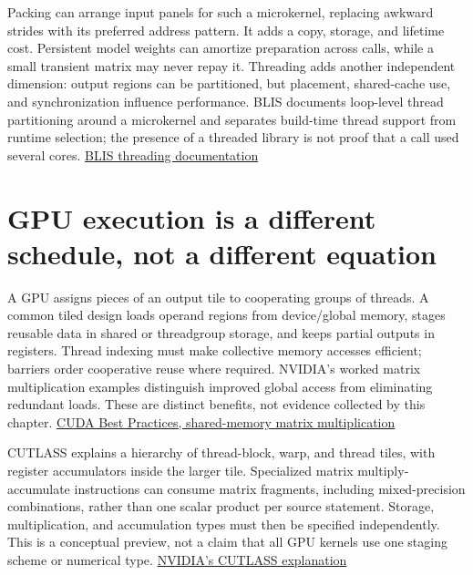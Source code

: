 Packing can arrange input panels for such a microkernel, replacing
awkward strides with its preferred address pattern. It adds a copy,
storage, and lifetime cost. Persistent model weights can amortize
preparation across calls, while a small transient matrix may never repay
it. Threading adds another independent dimension: output regions can be
partitioned, but placement, shared-cache use, and synchronization
influence performance. BLIS documents loop-level thread partitioning
around a microkernel and separates build-time thread support from
runtime selection; the presence of a threaded library is not proof that
a call used several cores.
\href{https://github.com/flame/blis/blob/master/docs/Multithreading.md}{BLIS
threading documentation}

\section{GPU execution is a different schedule, not a different
equation}\label{gpu-execution-is-a-different-schedule-not-a-different-equation}


A GPU assigns pieces of an output tile to cooperating groups of threads.
A common tiled design loads operand regions from device/global memory,
stages reusable data in shared or threadgroup storage, and keeps partial
outputs in registers. Thread indexing must make collective memory
accesses efficient; barriers order cooperative reuse where required.
NVIDIA's worked matrix multiplication examples distinguish improved
global access from eliminating redundant loads. These are distinct
benefits, not evidence collected by this chapter.
\href{https://docs.nvidia.com/cuda/cuda-c-best-practices-guide/index.html\#shared-memory-in-matrix-multiplication-c-ab}{CUDA
Best Practices, shared-memory matrix multiplication}

CUTLASS explains a hierarchy of thread-block, warp, and thread tiles,
with register accumulators inside the larger tile. Specialized matrix
multiply-accumulate instructions can consume matrix fragments, including
mixed-precision combinations, rather than one scalar product per source
statement. Storage, multiplication, and accumulation types must then be
specified independently. This is a conceptual preview, not a claim that
all GPU kernels use one staging scheme or numerical type.
\href{https://developer.nvidia.com/blog/cutlass-linear-algebra-cuda/}{NVIDIA's
CUTLASS explanation}

